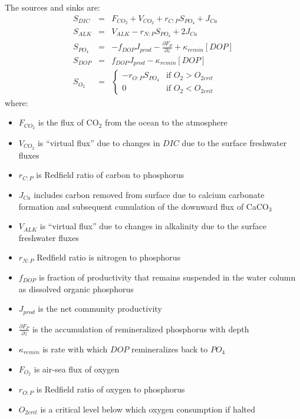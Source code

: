 The sources and sinks are:
\begin{eqnarray}
S_{DIC} & = &  F_{CO_2} + V_{CO_2} + r_{C:P} S_{PO_4}  + J_{Ca} \label{lEsdic} \\
S_{ALK} & = &  V_{ALK}-r_{N:P} S_{PO_4}  + 2 J_{Ca} \label{lEsalk} \\
S_{PO_4}& = &  -f_{DOP} J_{prod} - \frac{\partial F_P}{\partial z} + \kappa_{remin} [DOP]\\
S_{DOP} & = &  f_{DOP} J_{prod} -\kappa_{remin} [DOP] \\
S_{O_2} & = & \left\{ \begin{array}{ll}
               -r_{O:P} S_{PO_4} & \mbox{if $O_2>O_{2crit}$} \\
                0  & \mbox{if $O_2<O_{2crit}$}
                      \end{array}
              \right. 
\end{eqnarray}
where:
\begin{itemize}
\item $F_{CO_2}$ is the flux of CO$_2$ from the ocean to the
  atmosphere
\item $V_{CO_2}$ is ``virtual flux'' due to changes in $DIC$ due to
  the surface freshwater fluxes
\item $r_{C:P}$ is Redfield ratio of carbon to phosphorus
\item $J_{Ca}$ includes carbon removed from surface due to calcium
  carbonate formation and subsequent cumulation of the downward flux
  of CaCO$_3$
\item $V_{ALK}$ is ``virtual flux'' due to changes in alkalinity due
  to the surface freshwater fluxes
\item $r_{N:P}$ Redfield ratio is nitrogen to phosphorus
\item $f_{DOP}$ is fraction of productivity that remains suspended in
  the water column as dissolved organic phosphorus
\item $J_{prod}$ is the net community productivity
\item $\frac{\partial F_P}{\partial z}$ is the accumulation of
  remineralized phosphorus with depth
\item $\kappa_{remin}$ is rate with which $DOP$ remineralizes back to
  $PO_4$
\item $F_{O_2}$ is air-sea flux of oxygen
\item $r_{O:P}$ is Redfield ratio of oxygen to phosphorus
\item $O_{2crit}$ is a critical level below which oxygen consumption
  if halted
\end{itemize}

